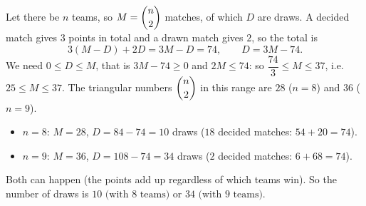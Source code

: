 Let there be $n$ teams, so $M=\dbinom n2$ matches, of which $D$ are draws. A decided match gives $3$ points in total and a drawn match gives $2$, so the total is
\[
3(M-D)+2D=3M-D=74,\qquad D=3M-74 .
\]
We need $0\le D\le M$, that is $3M-74\ge0$ and $2M\le74$: so $\dfrac{74}{3}\le M\le37$, i.e. $25\le M\le37$. The triangular numbers $\dbinom n2$ in this range are $28$ ($n=8$) and $36$ ($n=9$).
\begin{itemize}
\item $n=8$: $M=28$, $D=84-74=10$ draws ($18$ decided matches: $54+20=74$).
\item $n=9$: $M=36$, $D=108-74=34$ draws ($2$ decided matches: $6+68=74$).
\end{itemize}
Both can happen (the points add up regardless of which teams win). So the number of draws is $\boxed{10 \text{ (with } 8\text{ teams) or } 34 \text{ (with } 9\text{ teams)}}$.
